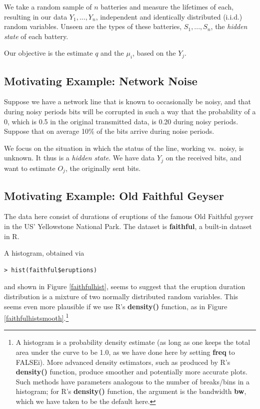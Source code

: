 \documentclass[11pt]{article}
\begin{document}
We take a random sample of $n$ batteries and measure the lifetimes of
each, resulting in our data $Y_1,...,Y_n$, independent and identically
distributed (i.i.d.) random variables.  Unseen are the types of these
batteries, $S_1,...,S_n$, the \textit{hidden state} of each battery.

Our objective is the estimate $q$ and the $\mu_i$, based on the $Y_j$.  

\subsection{Motivating Example:  Network Noise}

Suppose we have a network line that is known to occasionally be
noisy, and that during noisy periods bits will be corrupted in such
a way that the probability of a 0, which is 0.5 in the original
transmitted data, is 0.20 during noisy periods.  Suppose that on average
10\% of the bits arrive during noise periods.

We focus on the situation in which the status of the line, working vs.\
noisy, is unknown.  It thus is a \textit{hidden state}.  We have data
$Y_j$ on the received bits, and want to estimate $O_j$, the originally
sent bits.

\subsection{Motivating Example:  Old Faithful Geyser}

The data here consist of durations of eruptions of the famous
Old Faithful geyser in the US' Yellowstone National Park.  The dataset
is \textbf{faithful}, a built-in dataset in R.

A histogram, obtained via 

\begin{lstlisting}
> hist(faithful$eruptions)
\end{lstlisting}

and shown in Figure \ref{faithfulhist}, seems to suggest that the
eruption duration distribution is a mixture of two normally distributed random
variables.  This seems even more plausible if we use R's 
\textbf{density()} function, as in Figure
\ref{faithfulhistsmooth}.\footnote{A histogram is a probability density
estimate (as long as one keeps the total area under the curve to be 1.0,
as we have done here by setting \textbf{freq} to FALSEi).  More advanced
density estimators, such as produced by R's \textbf{density()} function,
produce smoother and potentially more accurate plots.  Such methods have
parameters analogous to the number of breaks/bins in a histogram; for
R's \textbf{density()} function, the argument is the bandwidth
\textbf{bw}, which we have taken to be the default here.}
\end{document}
